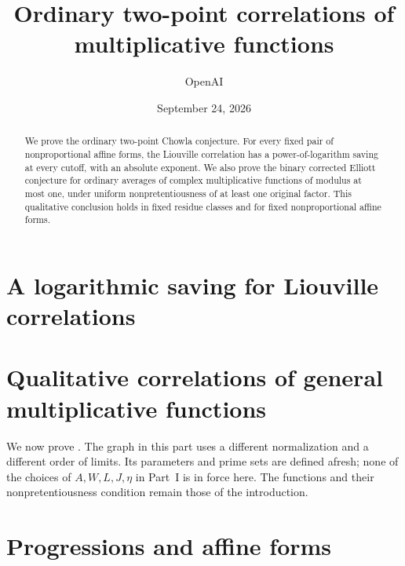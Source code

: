 \documentclass[11pt]{article}
\title{Ordinary two-point correlations of multiplicative functions}
\author{OpenAI}
\date{September 24, 2026}
\numberwithin{equation}{section}
\theoremstyle{definition}
\theoremstyle{remark}
\newcommand{\1}{\mathbf 1}
\begin{document}
\maketitle
\begin{abstract}
We prove the ordinary two-point Chowla conjecture. For every fixed pair
of nonproportional affine forms, the Liouville correlation has a
power-of-logarithm saving at every cutoff, with an absolute exponent.
We also prove the binary corrected Elliott conjecture for ordinary
averages of complex multiplicative functions of modulus at most one,
under uniform nonpretentiousness of at least one original factor.
This qualitative conclusion holds in fixed residue classes and for
fixed nonproportional affine forms.
\end{abstract}
\tableofcontents

\part{A logarithmic saving for Liouville correlations}








\part{Qualitative correlations of general multiplicative functions}
\noindent
We now prove . The graph in this part uses a different
normalization and a different order of limits. Its parameters and prime
sets are defined afresh; none of the choices of \(A,W,L,J,\eta\) in
Part~I is in force here. The functions and their nonpretentiousness
condition remain those of the introduction.







\part{Progressions and affine forms}

\begingroup\small


\endgroup
\end{document}
